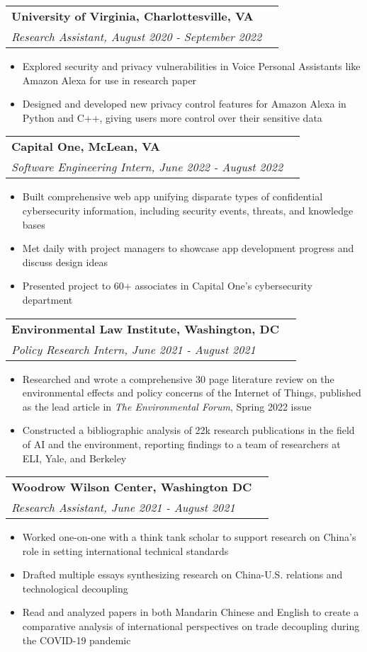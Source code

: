 \documentclass[letterpaper,11pt]{article}
\makeatletter
\newcommand{\resumeItem}[1]{
  \item\small{
    {#1} \vspace{-2pt}
  }
}
\newcommand{\resumeSubheadingThree}[3]{
  \vspace{-1pt}\item %
    \begin{tabular*}{0.97\textwidth}{l@{\extracolsep{\fill}}r}
      \textbf{#1} & #2 \\
      \textit{\small#3} \\
    \end{tabular*}\vspace{-5pt}
}
\newcommand{\resumeItemListStart}{\begin{itemize}}
\newcommand{\resumeItemListEnd}{\end{itemize}\vspace{-5pt}}
\makeatother
\begin{document}
    \resumeSubheadingThree
      {University of Virginia{\normalfont, Charlottesville, VA}}{}{Research Assistant, {\normalfont August 2020 - September 2022}}
      \resumeItemListStart
        \resumeItem{Explored security and privacy vulnerabilities in Voice Personal Assistants like Amazon Alexa for use in research paper}
        \resumeItem{Designed and developed new privacy control features for Amazon Alexa in Python and C++, giving users more control over their sensitive data}
      \resumeItemListEnd

    \resumeSubheadingThree
      {Capital One{\normalfont , McLean, VA}}{}{Software Engineering Intern, {\normalfont June 2022 - August 2022}}
      \resumeItemListStart
        \resumeItem{Built comprehensive web app unifying disparate types of confidential cybersecurity information, including security events, threats, and knowledge bases}
        \resumeItem{Met daily with project managers to showcase app development progress and discuss design ideas}
        \resumeItem{Presented project to 60+ associates in Capital One's cybersecurity department}
      \resumeItemListEnd

    \resumeSubheadingThree
      {Environmental Law Institute{\normalfont , Washington, DC}}{}{Policy Research Intern, {\normalfont June 2021 - August 2021}}
      \resumeItemListStart
        \resumeItem{Researched and wrote a comprehensive 30 page literature review on the environmental effects and policy concerns of the Internet of Things, published as the lead article in \emph{The Environmental Forum}, Spring 2022 issue}
        \resumeItem{Constructed a bibliographic analysis of 22k research publications in the field of AI and the environment, reporting findings to a team of researchers at ELI, Yale, and Berkeley}
      \resumeItemListEnd

    \resumeSubheadingThree
      {Woodrow Wilson Center{\normalfont , Washington DC}}{}{Research Assistant, {\normalfont June 2021 - August 2021}}
      \resumeItemListStart
        \resumeItem{Worked one-on-one with a think tank scholar to support research on China's role in setting international technical standards}
        \resumeItem{Drafted multiple essays synthesizing research on China-U.S. relations and technological decoupling}
        \resumeItem{Read and analyzed papers in both Mandarin Chinese and English to create a comparative analysis of international perspectives on trade decoupling during the COVID-19 pandemic}
      \resumeItemListEnd
\end{document}
